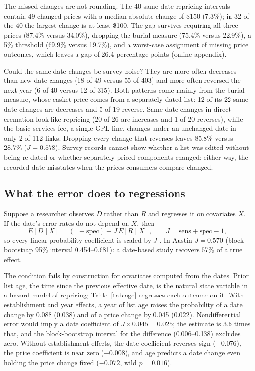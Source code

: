 \documentclass[preprint,12pt,authoryear]{elsarticle}
\begin{document}
The missed changes are not rounding. The 40 same-date repricing intervals contain 49 changed prices with a median absolute change of \$150 (7.3\%); in 32 of the 40 the largest change is at least \$100. The gap survives requiring all three prices (87.4\% versus 34.0\%), dropping the burial measure (75.4\% versus 22.9\%), a 5\% threshold (69.9\% versus 19.7\%), and a worst-case assignment of missing price outcomes, which leaves a gap of 26.4 percentage points (online appendix).

Could the same-date changes be survey noise? They are more often decreases than new-date changes (18 of 49 versus 55 of 403) and more often reversed the next year (6 of 40 versus 12 of 315). Both patterns come mainly from the burial measure, whose casket price comes from a separately dated list: 12 of its 22 same-date changes are decreases and 5 of 19 reverse. Same-date changes in direct cremation look like repricing (20 of 26 are increases and 1 of 20 reverses), while the basic-services fee, a single GPL line, changes under an unchanged date in only 2 of 112 links. Dropping every change that reverses leaves 85.8\% versus 28.7\% ($J=0.578$). Survey records cannot show whether a list was edited without being re-dated or whether separately priced components changed; either way, the recorded date misstates when the prices consumers compare changed.

\subsection{What the error does to regressions}
Suppose a researcher observes $D$ rather than $R$ and regresses it on covariates $X$. If the date's error rates do not depend on $X$, then
\begin{equation}
E[D\mid X] = (1-\text{spec}) + J\,E[R\mid X], \qquad J = \text{sens}+\text{spec}-1,
\end{equation}
so every linear-probability coefficient is scaled by $J$ \citep{hausman_abrevaya_scottmorton_1998}. In Austin $J=0.570$ (block-bootstrap 95\% interval 0.454--0.681): a date-based study recovers 57\% of a true effect.

The condition fails by construction for covariates computed from the dates. Prior list age, the time since the previous effective date, is the natural state variable in a hazard model of repricing; Table~\ref{tab:age} regresses each outcome on it. With establishment and year effects, a year of list age raises the probability of a date change by 0.088 (0.038) and of a price change by 0.045 (0.022). Nondifferential error would imply a date coefficient of $J\times0.045=0.025$; the estimate is 3.5 times that, and the block-bootstrap interval for the difference (0.006--0.138) excludes zero. Without establishment effects, the date coefficient reverses sign ($-0.076$), the price coefficient is near zero ($-0.008$), and age predicts a date change even holding the price change fixed ($-0.072$, wild $p=0.016$).
\end{document}
